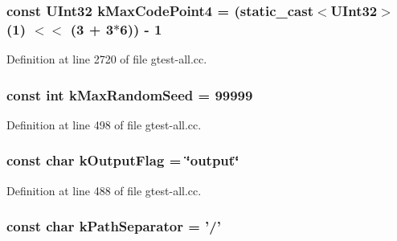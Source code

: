 \hypertarget{namespacetesting_1_1internal_acea916a3388da016d05faccd72e51f18}{
\subsubsection[{k\-Max\-Code\-Point4}]{\setlength{\rightskip}{0pt plus 5cm}const {\bf \-U\-Int32} {\bf k\-Max\-Code\-Point4} = (static\-\_\-cast$<${\bf \-U\-Int32}$>$(1) $<$$<$ (3 + 3$\ast$6)) -\/ 1}}\label{d0/da7/namespacetesting_1_1internal_acea916a3388da016d05faccd72e51f18}


\-Definition at line 2720 of file gtest-\/all.\-cc.

\hypertarget{namespacetesting_1_1internal_a19c875806aebc654557928c5df5f8ea5}{
\subsubsection[{k\-Max\-Random\-Seed}]{\setlength{\rightskip}{0pt plus 5cm}const int {\bf k\-Max\-Random\-Seed} = 99999}}\label{d0/da7/namespacetesting_1_1internal_a19c875806aebc654557928c5df5f8ea5}


\-Definition at line 498 of file gtest-\/all.\-cc.

\hypertarget{namespacetesting_1_1internal_add148191334fbc797c9a2cc2fff82670}{
\subsubsection[{k\-Output\-Flag}]{\setlength{\rightskip}{0pt plus 5cm}const char {\bf k\-Output\-Flag} = \char`\"{}output\char`\"{}}}\label{d0/da7/namespacetesting_1_1internal_add148191334fbc797c9a2cc2fff82670}


\-Definition at line 488 of file gtest-\/all.\-cc.

\hypertarget{namespacetesting_1_1internal_a75d57ad7e8a7b67ff04ff8855f90acc7}{
\subsubsection[{k\-Path\-Separator}]{\setlength{\rightskip}{0pt plus 5cm}const char {\bf k\-Path\-Separator} = '/'}}\label{d0/da7/namespacetesting_1_1internal_a75d57ad7e8a7b67ff04ff8855f90acc7}


